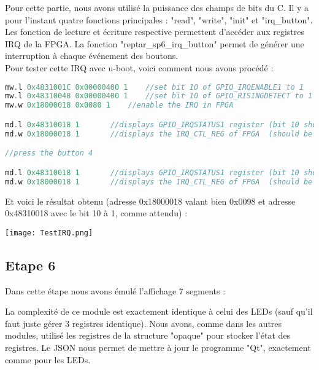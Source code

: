 Pour cette partie, nous avons utilisé la puissance des champs de bits du C. Il y a pour l'instant quatre fonctions principales : "read", "write", "init" et "irq\_button". Les fonction de lecture et écriture respective permettent d'accéder aux registres IRQ de la FPGA. La fonction "reptar\_sp6\_irq\_button" permet de générer une interruption à chaque événement des boutons.  \\


Pour tester cette IRQ avec u-boot, voici comment nous avons procédé :
\begin{lstlisting}[language=C,caption=Commandes u-boot]
mw.l 0x4831001C 0x00000400 1	//set bit 10 of GPIO_IRQENABLE1 to 1
mw.l 0x48310048 0x00000400 1	//set bit 10 of GPIO_RISINGDETECT to 1
mw.w 0x18000018 0x0080 1	//enable the IRQ in FPGA

md.l 0x48310018 1		//displays GPIO_IRQSTATUS1 register (bit 10 should be 0)
md.w 0x18000018 1		//displays the IRQ_CTL_REG of FPGA  (should be 0x0080)

//press the button 4

md.l 0x48310018 1		//displays GPIO_IRQSTATUS1 register (bit 10 should be 1)
md.w 0x18000018 1		//displays the IRQ_CTL_REG of FPGA  (should be 0x0098)
\end{lstlisting}



Et voici le résultat obtenu (adresse 0x18000018 valant bien 0x0098 et adresse 0x48310018 avec le bit 10 à 1, comme attendu) :
\begin{center} 
\hspace{12.45cm}
\texttt{[image: TestIRQ.png]}
\end{center}
\vspace{1cm} 


\pagebreak
\subsection{Etape 6}
Dans cette étape nous avons émulé l'affichage 7 segments :

\vspace{0.5cm} 

\vspace{0.5cm} 

La complexité de ce module est exactement identique à celui des LEDs (sauf qu'il faut juste gérer 3 registres identique). Nous avons, comme dans les autres modules, utilisé les registres de la structure "opaque" pour stocker l'état des registres. Le JSON nous permet de mettre à jour le programme "Qt", exactement comme pour les LEDs.\\

